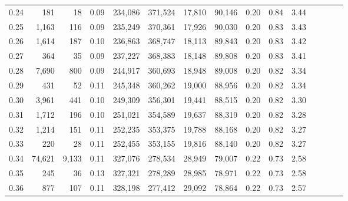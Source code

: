 \begin{tabular}{rrrcrrrrrrrrrrr}
0.24 &     181 &      18 &                                       0.09 &  234,086 &  371,524 &   17,810 &   90,146 &  0.20 &  0.84 &                         3.44 \\
0.25 &   1,163 &     116 &                                       0.09 &  235,249 &  370,361 &   17,926 &   90,030 &  0.20 &  0.83 &                         3.43 \\
0.26 &   1,614 &     187 &                                       0.10 &  236,863 &  368,747 &   18,113 &   89,843 &  0.20 &  0.83 &                         3.42 \\
0.27 &     364 &      35 &                                       0.09 &  237,227 &  368,383 &   18,148 &   89,808 &  0.20 &  0.83 &                         3.41 \\
0.28 &   7,690 &     800 &                                       0.09 &  244,917 &  360,693 &   18,948 &   89,008 &  0.20 &  0.82 &                         3.34 \\
0.29 &     431 &      52 &                                       0.11 &  245,348 &  360,262 &   19,000 &   88,956 &  0.20 &  0.82 &                         3.34 \\
0.30 &   3,961 &     441 &                                       0.10 &  249,309 &  356,301 &   19,441 &   88,515 &  0.20 &  0.82 &                         3.30 \\
0.31 &   1,712 &     196 &                                       0.10 &  251,021 &  354,589 &   19,637 &   88,319 &  0.20 &  0.82 &                         3.28 \\
0.32 &   1,214 &     151 &                                       0.11 &  252,235 &  353,375 &   19,788 &   88,168 &  0.20 &  0.82 &                         3.27 \\
0.33 &     220 &      28 &                                       0.11 &  252,455 &  353,155 &   19,816 &   88,140 &  0.20 &  0.82 &                         3.27 \\
0.34 &  74,621 &   9,133 &                                       0.11 &  327,076 &  278,534 &   28,949 &   79,007 &  0.22 &  0.73 &                         2.58 \\
0.35 &     245 &      36 &                                       0.13 &  327,321 &  278,289 &   28,985 &   78,971 &  0.22 &  0.73 &                         2.58 \\
0.36 &     877 &     107 &                                       0.11 &  328,198 &  277,412 &   29,092 &   78,864 &  0.22 &  0.73 &                         2.57 \\

\end{tabular}
